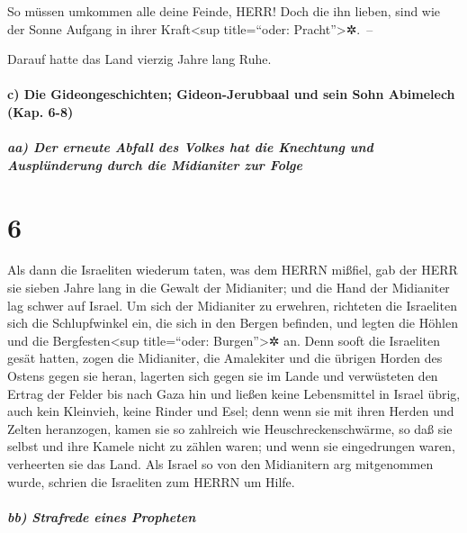 So müssen umkommen alle deine Feinde, HERR! Doch die ihn
lieben, sind wie der Sonne Aufgang in ihrer Kraft\textless sup
title=``oder: Pracht''\textgreater✲.~--

Darauf hatte das Land vierzig Jahre lang Ruhe.

\hypertarget{c-die-gideongeschichten-gideon-jerubbaal-und-sein-sohn-abimelech-kap.-6-8}{%
\paragraph{c) Die Gideongeschichten; Gideon-Jerubbaal und sein Sohn
Abimelech (Kap.
6-8)}\label{c-die-gideongeschichten-gideon-jerubbaal-und-sein-sohn-abimelech-kap.-6-8}}

\hypertarget{aa-der-erneute-abfall-des-volkes-hat-die-knechtung-und-auspluxfcnderung-durch-die-midianiter-zur-folge}{%
\subparagraph{aa) Der erneute Abfall des Volkes hat die Knechtung und
Ausplünderung durch die Midianiter zur
Folge}\label{aa-der-erneute-abfall-des-volkes-hat-die-knechtung-und-auspluxfcnderung-durch-die-midianiter-zur-folge}}

\hypertarget{section-5}{%
\section{6}\label{section-5}}

Als dann die Israeliten wiederum taten, was dem HERRN
mißfiel, gab der HERR sie sieben Jahre lang in die Gewalt der
Midianiter; und die Hand der Midianiter lag schwer auf
Israel. Um sich der Midianiter zu erwehren, richteten die Israeliten
sich die Schlupfwinkel ein, die sich in den Bergen befinden, und legten
die Höhlen und die Bergfesten\textless sup title=``oder:
Burgen''\textgreater✲ an. Denn sooft die Israeliten gesät
hatten, zogen die Midianiter, die Amalekiter und die übrigen Horden des
Ostens gegen sie heran, lagerten sich gegen sie im Lande
und verwüsteten den Ertrag der Felder bis nach Gaza hin und ließen keine
Lebensmittel in Israel übrig, auch kein Kleinvieh, keine Rinder und
Esel; denn wenn sie mit ihren Herden und Zelten
heranzogen, kamen sie so zahlreich wie Heuschreckenschwärme, so daß sie
selbst und ihre Kamele nicht zu zählen waren; und wenn sie eingedrungen
waren, verheerten sie das Land. Als Israel so von den
Midianitern arg mitgenommen wurde, schrien die Israeliten zum HERRN um
Hilfe.

\hypertarget{bb-strafrede-eines-propheten}{%
\subparagraph{bb) Strafrede eines
Propheten}\label{bb-strafrede-eines-propheten}}

